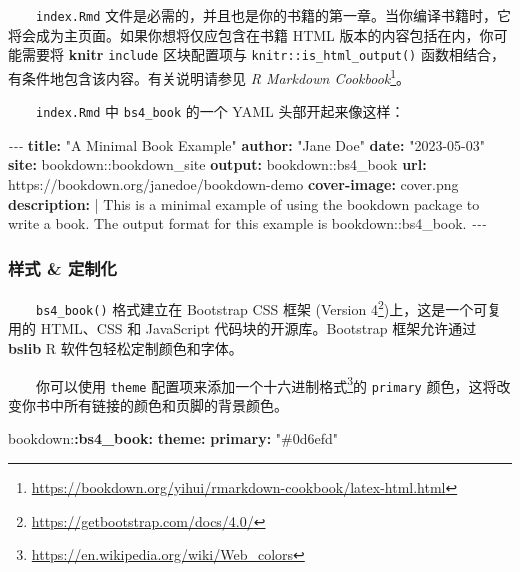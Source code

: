 \documentclass[
  12pt,
]{krantz}
\newenvironment{Shaded}{\begin{snugshade}}{\end{snugshade}}
\newcommand{\AttributeTok}[1]{\textcolor[rgb]{0.13,0.29,0.53}{#1}}
\newcommand{\CharTok}[1]{\textcolor[rgb]{0.31,0.60,0.02}{#1}}
\newcommand{\FunctionTok}[1]{\textcolor[rgb]{0.13,0.29,0.53}{\textbf{#1}}}
\newcommand{\KeywordTok}[1]{\textcolor[rgb]{0.13,0.29,0.53}{\textbf{#1}}}
\newcommand{\NormalTok}[1]{#1}
\newcommand{\PreprocessorTok}[1]{\textcolor[rgb]{0.56,0.35,0.01}{\textit{#1}}}
\newcommand{\StringTok}[1]{\textcolor[rgb]{0.31,0.60,0.02}{#1}}
\renewcommand{\href}[2]{#2\footnote{\url{#1}}}
\theoremstyle{definition}
\theoremstyle{definition}
\theoremstyle{definition}
\theoremstyle{definition}
\theoremstyle{remark}
\begin{document}
  \texttt{index.Rmd} 文件是必需的，并且也是你的书籍的第一章。当你编译书籍时，它将会成为主页面。如果你想将仅应包含在书籍 HTML 版本的内容包括在内，你可能需要将 \textbf{knitr} \texttt{include} 区块配置项与 \texttt{knitr::is\_html\_output()} 函数相结合，有条件地包含该内容。有关说明请参见 \href{https://bookdown.org/yihui/rmarkdown-cookbook/latex-html.html}{\emph{R Markdown Cookbook}}。

  \texttt{index.Rmd} 中 \texttt{bs4\_book} 的一个 YAML 头部开起来像这样：

\begin{Shaded}
\begin{Highlighting}[]
\PreprocessorTok{{-}{-}{-}}
\FunctionTok{title}\KeywordTok{:}\AttributeTok{ }\StringTok{"A Minimal Book Example"}
\FunctionTok{author}\KeywordTok{:}\AttributeTok{ }\StringTok{"Jane Doe"}
\FunctionTok{date}\KeywordTok{:}\AttributeTok{ }\StringTok{"2023{-}05{-}03"}
\FunctionTok{site}\KeywordTok{:}\AttributeTok{ bookdown::bookdown\_site}
\FunctionTok{output}\KeywordTok{:}\AttributeTok{ bookdown::bs4\_book}
\FunctionTok{url}\KeywordTok{:}\AttributeTok{ https://bookdown.org/janedoe/bookdown{-}demo}
\FunctionTok{cover{-}image}\KeywordTok{:}\AttributeTok{ cover.png}
\FunctionTok{description}\KeywordTok{: }\CharTok{|}
\NormalTok{  This is a minimal example of using the bookdown package to write a book.}
\NormalTok{  The output format for this example is bookdown::bs4\_book.}
\PreprocessorTok{{-}{-}{-}}
\end{Highlighting}
\end{Shaded}

\hypertarget{ux6837ux5f0f-ux5b9aux5236ux5316}{%
\subsubsection{样式 \& 定制化}\label{ux6837ux5f0f-ux5b9aux5236ux5316}}

  \texttt{bs4\_book()} 格式建立在 Bootstrap CSS 框架 (\href{https://getbootstrap.com/docs/4.0/}{Version 4})上，这是一个可复用的 HTML、CSS 和 JavaScript 代码块的开源库。Bootstrap 框架允许通过 \textbf{bslib} R 软件包轻松定制颜色和字体。

  你可以使用 \texttt{theme} 配置项来添加一个\href{https://en.wikipedia.org/wiki/Web_colors}{十六进制格式}的 \texttt{primary} 颜色，这将改变你书中所有链接的颜色和页脚的背景颜色。

\begin{Shaded}
\begin{Highlighting}[]
\AttributeTok{bookdown:}\FunctionTok{:bs4\_book}\KeywordTok{:}
\AttributeTok{  }\FunctionTok{theme}\KeywordTok{:}
\AttributeTok{    }\FunctionTok{primary}\KeywordTok{:}\AttributeTok{ }\StringTok{"\#0d6efd"}\AttributeTok{   }
\end{Highlighting}
\end{Shaded}
\end{document}
